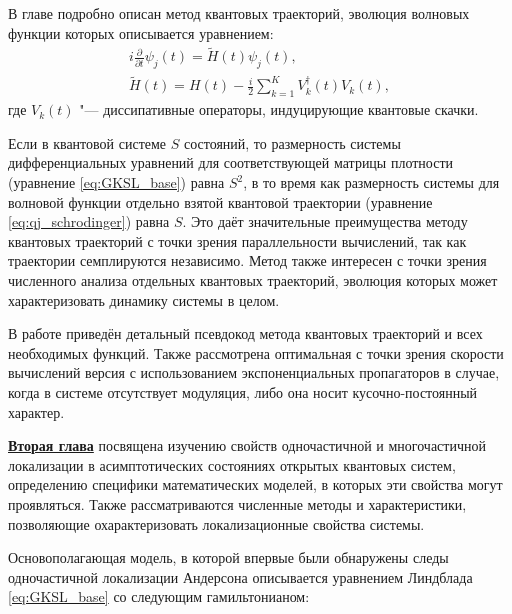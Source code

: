 В главе подробно описан метод квантовых траекторий, эволюция волновых функции которых описывается уравнением:
\begin{equation}
	\label{eq:qj_schrodinger}
	\begin{gathered}
		i \frac{\partial}{\partial t} \psi_j(t) = \tilde{H}(t) \psi_j(t), \\
		\tilde{H}(t) = H(t) - \frac{i}{2} \sum_{k=1}^{K} V_k^\dagger(t) V_k(t),
	\end{gathered}
\end{equation}
где \(V_k(t)\) "--- диссипативные операторы, индуцирующие квантовые скачки.

Если в квантовой системе $S$ состояний, то размерность системы дифференциальных уравнений для соответствующей матрицы плотности (уравнение \cref{eq:GKSL_base}) равна $S^2$, в то время как размерность системы для волновой функции отдельно взятой квантовой траектории (уравнение \cref{eq:qj_schrodinger}) равна $S$. 
Это даёт значительные преимущества методу квантовых траекторий с точки зрения параллельности вычислений, так как траектории семплируются независимо. 
Метод также интересен с точки зрения численного анализа отдельных квантовых траекторий, эволюция которых может характеризовать динамику системы в целом. 

В работе приведён детальный псевдокод метода квантовых траекторий и всех необходимых функций. Также рассмотрена оптимальная с точки зрения скорости вычислений версия с использованием экспоненциальных пропагаторов в случае, когда в системе отсутствует модуляция, либо она носит кусочно-постоянный характер.

\underline{\textbf{Вторая глава}} посвящена изучению свойств одночастичной и многочастичной локализации в асимптотических состояниях открытых квантовых систем, определению специфики математических моделей, в которых эти свойства могут проявляться.
Также рассматриваются численные методы и характеристики, позволяющие охарактеризовать локализационные свойства системы. 

Основополагающая модель, в которой впервые были обнаружены следы одночастичной локализации Андерсона \cite{Yusipov2017} описывается уравнением Линдблада \cref{eq:GKSL_base} со следующим гамильтонианом:

